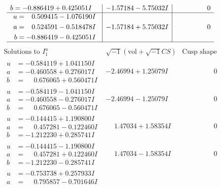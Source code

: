 \documentclass[1p]{elsarticle_modified}
\theoremstyle{definition}
\newcommand{\I}{\sqrt{-1}}
\begin{document}
$$\begin{array}{c|c|c}
\begin{aligned}
b &= -0.886419 + 0.425051 I\end{aligned}
 & -1.57184 - 5.75032 I & \phantom{-0.000000 } 0 \\ \hline\begin{aligned}
u &= \phantom{-}0.509415 - 1.076190 I \\
a &= \phantom{-}0.524591 - 0.518478 I \\
b &= -0.886419 - 0.425051 I\end{aligned}
 & -1.57184 + 5.75032 I & \phantom{-0.000000 } 0\\
 \hline 
 \end{array}$$\newpage$$\begin{array}{c|c|c}  
\text{Solutions to }I^u_{1}& \I (\text{vol} + \sqrt{-1}CS) & \text{Cusp shape}\\
 \hline 
\begin{aligned}
u &= -0.584119 + 1.041150 I \\
a &= -0.460558 + 0.276017 I \\
b &= \phantom{-}0.676065 + 0.560471 I\end{aligned}
 & -2.46994 + 1.25079 I & \phantom{-0.000000 } 0 \\ \hline\begin{aligned}
u &= -0.584119 - 1.041150 I \\
a &= -0.460558 - 0.276017 I \\
b &= \phantom{-}0.676065 - 0.560471 I\end{aligned}
 & -2.46994 - 1.25079 I & \phantom{-0.000000 } 0 \\ \hline\begin{aligned}
u &= -0.144415 + 1.190800 I \\
a &= \phantom{-}0.457281 - 0.122460 I \\
b &= -1.212230 + 0.285741 I\end{aligned}
 & \phantom{-}1.47034 + 1.58354 I & \phantom{-0.000000 } 0 \\ \hline\begin{aligned}
u &= -0.144415 - 1.190800 I \\
a &= \phantom{-}0.457281 + 0.122460 I \\
b &= -1.212230 - 0.285741 I\end{aligned}
 & \phantom{-}1.47034 - 1.58354 I & \phantom{-0.000000 } 0 \\ \hline\begin{aligned}
u &= -0.753738 + 0.257933 I \\
a &= \phantom{-}0.795857 - 0.701646 I \\

\end{aligned}
\end{array}$$
\end{document}
